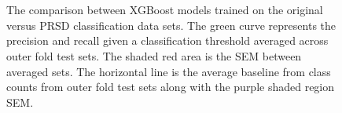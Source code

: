 \documentclass[11pt,a4paper]{article}                                %
\begin{document}
\begin{figure}[H]
\centering
{}
\\~\\
\caption{The comparison between XGBoost models trained on the original versus PRSD classification data sets. The green curve represents the precision and recall given a classification threshold averaged across outer fold test sets. The shaded red area is the SEM between averaged sets. The horizontal line is the average baseline from class counts from outer fold test sets along with the purple shaded region SEM.}
\end{figure}
\end{document}
